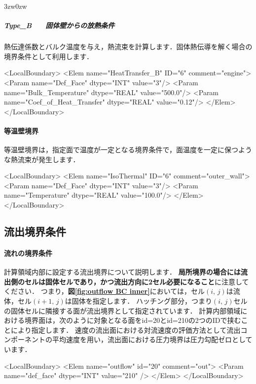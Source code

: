 \begin{indentation}{3zw}{0zw}
%
\subparagraph{Type\_B　　固体壁からの放熱条件}
熱伝達係数とバルク温度を与え，熱流束を計算します．固体熱伝導を解く場合の境界条件として利用します．

{\small
\begin{program}
<LocalBoundary>
  <Elem name="HeatTransfer_B" ID="6" comment="engine">
    <Param name="Def_Face"              dtype="INT"    value="3"/>
    <Param name="Bulk_Temperature"      dtype="REAL"   value="500.0"/>
    <Param name="Coef_of_Heat_Transfer" dtype="REAL"   value="0.12"/>
  </Elem>
</LocalBoundary>
\end{program}
}

\end{indentation}


%
\paragraph{等温壁境界}
等温壁境界は，指定面で温度が一定となる境界条件で，面温度を一定に保つような熱流束が発生します．

{\small
\begin{program}
<LocalBoundary>
  <Elem name="IsoThermal" ID="6" comment="outer_wall">
    <Param name="Def_Face"    dtype="INT"    value="3"/>
    <Param name="Temperature" dtype="REAL"   value="100.0"/>
  </Elem>
</LocalBoundary>
\end{program}
}


\subsection{流出境界条件}

\paragraph{流れの境界条件}
計算領域内部に設定する流出境界について説明します．
\textbf{局所境界の場合には流出側のセルは固体セルであり，かつ流出方向に2セル必要になること}に注意してください．
つまり，\textbf{図\ref{fig:outflow BC inner}}においては，セル$(i,\,j)$は流体，セル$(i+1,\,j)$は固体を指定します．
ハッチング部分，つまり$(i,\,j)$セルの固体セルに隣接する面が流出境界として指定されています．
計算内部領域における境界面は，次のように対象となる面をid=20とid=210の2つのIDで挟むことにより指定します．
速度の流出面における対流速度の評価方法として流出コンポーネントの平均速度を用い，流出面における圧力境界は圧力勾配ゼロとしています．

{\small
\begin{program}
<LocalBoundary> 
  <Elem name="outflow" id="20" comment="out">
    <Param name="def_face"    dtype="INT"    value="210" />
  </Elem>
</LocalBoundary>
\end{program}
}

